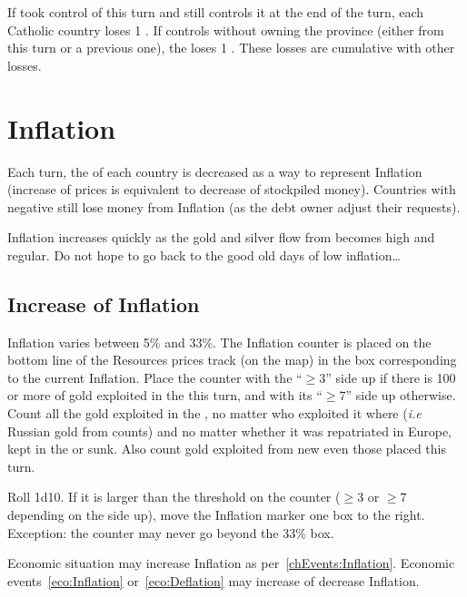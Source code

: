 \aparag[\villeRoma]
\bparag If \TUR took control of \villeRoma this turn and still controls it at
the end of the turn, each Catholic country loses 1 \STAB.
\bparag If \TUR controls \villeRoma without owning the province (either from
this turn or a previous one), the \SDCF loses 1 \STAB.
\bparag These losses are cumulative with other losses.

\section{Inflation}\label{chPeace:Inflation}
\aparag Each turn, the \RT of each country is decreased as a way to represent
Inflation (increase of prices is equivalent to decrease of stockpiled money).
\bparag Countries with negative \RT still lose money from Inflation (as the
debt owner adjust their requests).

\begin{designnote}
  Inflation increases quickly as the gold and silver flow from
  \continentAmerica becomes high and regular. Do not hope to go back to the
  good old days of low inflation\ldots
\end{designnote}

\subsection{Increase of Inflation}\label{chPeace:Increase Inflation}
\aparag Inflation varies between 5\% and 33\%. The Inflation counter is placed
on the bottom line of the Resources prices track (on the \ROTW map) in the box
corresponding to the current Inflation.
\bparag Place the counter with the ``$\geq 3$'' side up if there is 100\ducats
or more of gold exploited in the \ROTW this turn, and with its ``$\geq 7$''
side up otherwise.
\bparag Count all the gold exploited in the \ROTW, no matter who exploited it
where (\emph{i.e} Russian gold from \continentSiberia counts) and no matter
whether it was repatriated in Europe, kept in the \ROTW or sunk.
\bparag Also count gold exploited from new \COL even those placed this turn.

 Roll 1d10. If it is larger than the
threshold on the counter ($\geq 3$ or $\geq 7$ depending on the side up), move
the Inflation marker one box to the right.
\bparag Exception: the counter may never go beyond the 33\% box.

\bparag Economic situation may increase Inflation as
per~\ref{chEvents:Inflation}.
\bparag Economic events~\ref{eco:Inflation} or~\ref{eco:Deflation} may
increase of decrease Inflation.

